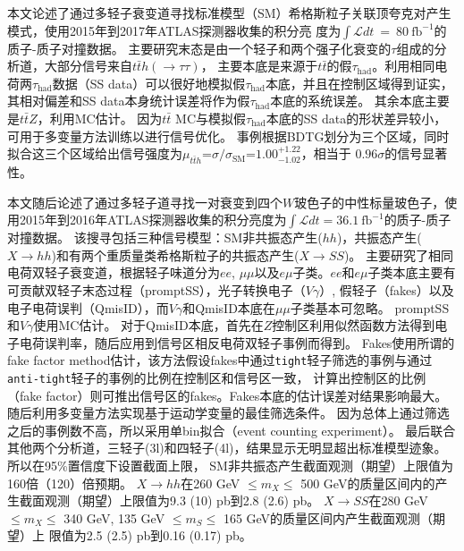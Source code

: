 本文论述了通过多轻子衰变道寻找标准模型（SM）希格斯粒子关联顶夸克对产生模式，使用2015年到2017年ATLAS探测器收集的积分亮
度为$\int \mathcal{L}dt~=~80~\text{fb}^{-1}$的质子-质子对撞数据。
主要研究末态是由一个轻子和两个强子化衰变的$\tau$组成的分析道\ltwotau ，大部分信号来自$t\bar{t}h(\rightarrow \tau\tau)$，
主要本底是来源于$t\bar{t}$的假$\tau_{\text{had}}$。利用相同电荷两$\tau_{\text{had}}$数据（SS data）可以很好地模拟假$\tau_{\text{had}}$本底，并且在控制区域得到证实，
其相对偏差和SS data本身统计误差将作为假$\tau_{\text{had}}$本底的系统误差。
其余本底主要是$t\bar{t}Z$，利用MC估计。
因为$t\bar{t}$ MC与模拟假$\tau_{\text{had}}$本底的SS data的形状差异较小，可用于多变量方法训练以进行信号优化。
事例根据BDTG划分为三个区域，同时拟合这三个区域给出信号强度为$\mu_{t\bar{t}h}$=$\sigma/\sigma_{\text{SM}}$=$1.00^{+1.22}_{-1.02}$，相当于
$0.96\sigma$的信号显著性。

本文随后论述了通过多轻子道寻找一对衰变到四个$W$玻色子的中性标量玻色子，使用2015年到2016年ATLAS探测器收集的积分亮度为$\int \mathcal{L}dt=36.1~\text{fb}^{-1}$的质子-质子对撞数据。
该搜寻包括三种信号模型：SM非共振态产生($hh$)，共振态产生($X\rightarrow hh$)和有两个重质量类希格斯粒子的共振态产生($X\rightarrow SS$)。
主要研究了相同电荷双轻子衰变道，根据轻子味道分为$ee$, $\mu\mu$以及$e\mu$子类。$ee$和$e\mu$子类本底主要有可贡献双轻子末态过程（promptSS），光子转换电子（$V\gamma$）,
假轻子（fakes）以及电子电荷误判（QmisID），而$V\gamma$和QmisID本底在$\mu\mu$子类基本可忽略。
promptSS和$V\gamma$使用MC估计。
对于QmisID本底，首先在$Z$控制区利用似然函数方法得到电子电荷误判率，随后应用到信号区相反电荷双轻子事例而得到。
Fakes使用所谓的fake factor method估计，该方法假设fakes中通过\texttt{tight}轻子筛选的事例与通过\texttt{anti-tight}轻子的事例的比例在控制区和信号区一致，
计算出控制区的比例（fake factor）则可推出信号区的fakes。Fakes本底的估计误差对结果影响最大。
随后利用多变量方法实现基于运动学变量的最佳筛选条件。
因为总体上通过筛选之后的事例数不高，所以采用单bin拟合（event counting experiment）。
最后联合其他两个分析道，三轻子(3l)和四轻子(4l)，结果显示无明显超出标准模型迹象。
所以在95\%置信度下设置截面上限，
SM非共振态产生截面观测（期望）上限值为160倍（120）倍预期。
$X\rightarrow hh$在260 GeV $\leq m_X\leq$ 500 GeV的质量区间内的产生截面观测（期望）上限值为9.3 (10) pb到2.8 (2.6) pb。
$X\rightarrow SS$在280 GeV $\leq m_X\leq$ 340 GeV, 135 GeV $\leq m_S\leq$ 165 GeV的质量区间内产生截面观测（期望）上
限值为2.5 (2.5) pb到0.16 (0.17) pb。

